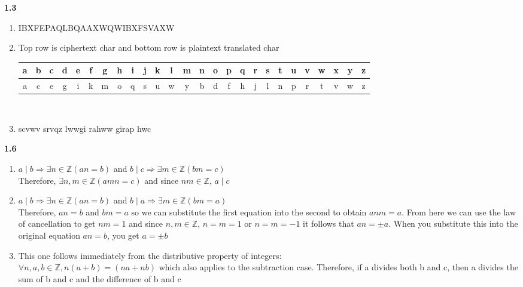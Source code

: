 \documentclass[a4paper, 11pt]{article}
\begin{document}
\noindent \textbf{1.3}
\begin{enumerate}[label=(\alph*)]
    \item IBXFEPAQLBQAAXWQWIBXFSVAXW
    \item Top row is ciphertext char and bottom row is plaintext translated char\\
        \begin{tabular}{ |c|c|c|c|c|c|c|c|c|c|c|c|c|c|c|c|c|c|c|c|c|c|c|c|c|c| } 
             \hline
                 a & b & c & d & e & f & g & h & i & j & k & l & m & n & o & p & q & r & s & t & u & v & w & x & y & z \\ 
             \hline
                 a & c & e & g & i & k & m & o & q & s & u & w & y & b & d & f & h & j & l & n & p & r & t & v & w & z \\ 
            \hline
        \end{tabular}\\
    \item  scvwv srvqz lwwgi rahww girap hwc 
\end{enumerate}

\newpage

\noindent \textbf{1.6}
\begin{enumerate}[label=(\alph*)]
    \item $a \mid b \Rightarrow \exists n \in\mathbb{Z}\left( an = b \right)$ and $b \mid c \Rightarrow \exists m \in\mathbb{Z}\left( bm = c \right)$ \\
        Therefore, $\exists n,m \in\mathbb{Z} \left( amn = c\right)$ and since $nm \in\mathbb{Z}$, $a \mid c$
    \item $a \mid b \Rightarrow \exists n \in\mathbb{Z}\left( an = b \right)$ and $b \mid a \Rightarrow \exists m \in\mathbb{Z}\left( bm = a \right)$ \\
     Therefore, $an=b$ and $bm=a$ so we can substitute the first equation into the second to obtain $anm=a$. From here we can use the law of cancellation to get $nm=1$ and since $n,m \in\mathbb{Z}$, $n=m=1$ or $n=m=-1$  it follows that $an = \pm a$. When you substitute this into the original equation $an=b$, you get $a = \pm b$
    \item This one follows immediately from the distributive property of integers: \\ $\forall n,a,b \in\mathbb{Z} , n(a+b) = (na+nb)$ which also applies to the subtraction case. Therefore, if a divides both b and c, then a divides the sum of b and c and the difference of b and c
\end{enumerate}\\
\end{document}
